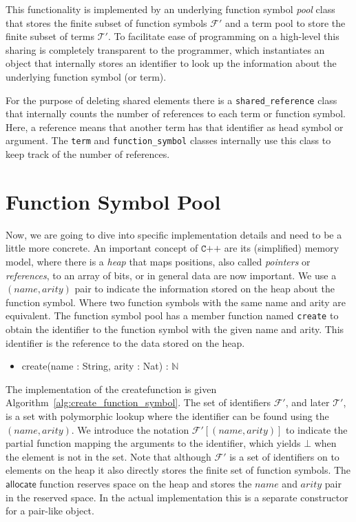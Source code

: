 \documentclass[10pt,a4paper]{article}
\theoremstyle{definition}
\newcommand{\naturalnumbers}{\mathbb{N}}
\newcommand{\functionsymbols}{\mathcal{F}}
\newcommand{\terms}{\mathcal{T}}
\newcommand{\name}{\textit{name}}
\newcommand{\tarity}{\textit{arity}}
\newcommand{\allocate}{\textsf{allocate}}
\newcommand{\create}{\textsf{create}}
\newcommand{\cpp}{\texttt{C++}}
\begin{document}
This functionality is implemented by an underlying function symbol \emph{pool} class that stores the finite subset of function symbols $\functionsymbols'$ and a term pool to store the finite subset of terms $\terms'$.
To facilitate ease of programming on a high-level this sharing is completely transparent to the programmer, which instantiates an object that internally stores an identifier to look up the information about the underlying function symbol (or term).

For the purpose of deleting shared elements there is a \verb|shared_reference| class that internally counts the number of references to each term or function symbol.
Here, a reference means that another term has that identifier as head symbol or argument.
The \texttt{term} and \texttt{function\_symbol} classes internally use this class to keep track of the number of references.

\section{Function Symbol Pool}

Now, we are going to dive into specific implementation details and need to be a little more concrete.
An important concept of $\cpp$ are its (simplified) memory model, where there is a \emph{heap} that maps positions, also called \emph{pointers} or \emph{references}, to an array of bits, or in general data are now important.
We use a $(\name, \tarity)$ pair to indicate the information stored on the heap about the function symbol.
Where two function symbols with the same name and arity are equivalent.
The function symbol pool has a member function named \verb|create| to obtain the identifier to the function symbol with the given name and arity.
This identifier is the reference to the data stored on the heap.

\begin{itemize}    
  \item \create(name : String, arity : Nat) : $\naturalnumbers$
\end{itemize}

\noindent The implementation of the \create function is given Algorithm~\ref{alg:create_function_symbol}.
The set of identifiers $\functionsymbols'$, and later $\terms'$, is a set with polymorphic lookup where the identifier can be found using the $(\name, \tarity)$.
We introduce the notation $\functionsymbols'[(\name, \tarity)]$ to indicate the partial function mapping the arguments to the identifier, which yields $\bot$ when the element is not in the set.
Note that although $\functionsymbols'$ is a set of identifiers on to elements on the heap it also directly stores the finite set of function symbols.
The $\allocate$ function reserves space on the heap and stores the $\name$ and $\tarity$ pair in the reserved space.
In the actual implementation this is a separate constructor for a pair-like object.
\end{document}
